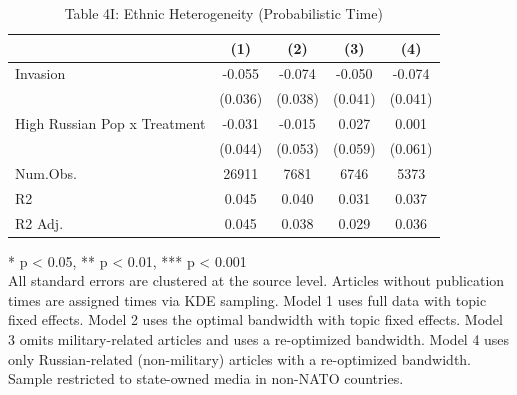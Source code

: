 \begin{table}[!t]
\caption{Table 4I: Ethnic Heterogeneity (Probabilistic Time)} 
\fontsize{12.0pt}{14.4pt}\selectfont
\begin{tabular*}{\linewidth}{@{\extracolsep{\fill}}lcccc}
\toprule
  & (1) & (2) & (3) & (4) \\ 
\midrule\addlinespace[2.5pt]
Invasion & -0.055 & -0.074 & -0.050 & -0.074 \\ 
 & (0.036) & (0.038) & (0.041) & (0.041) \\ 
High Russian Pop x Treatment & -0.031 & -0.015 & 0.027 & 0.001 \\ 
{} & {(0.044)} & {(0.053)} & {(0.059)} & {(0.061)} \\ 
Num.Obs. & 26911 & 7681 & 6746 & 5373 \\ 
R2 & 0.045 & 0.040 & 0.031 & 0.037 \\ 
R2 Adj. & 0.045 & 0.038 & 0.029 & 0.036 \\ 
\bottomrule
\end{tabular*}
\begin{minipage}{\linewidth}
* p < 0.05, ** p < 0.01, *** p < 0.001\\
All standard errors are clustered at the source level. Articles without
publication times are assigned times via KDE sampling. Model 1 uses full data
with topic fixed effects. Model 2 uses the optimal bandwidth with topic fixed
effects. Model 3 omits military-related articles and uses a re-optimized
bandwidth. Model 4 uses only Russian-related (non-military) articles with a
re-optimized bandwidth. Sample restricted to state-owned media in non-NATO
countries.\\
\end{minipage}
\end{table}

